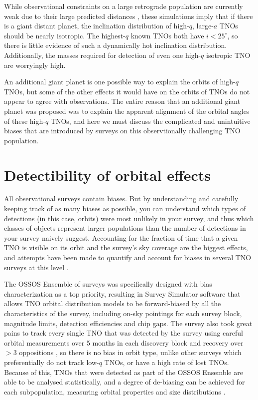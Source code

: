 \documentclass{aastex62}
\begin{document}
While observational constraints on a large retrograde population are currently weak due to their large predicted distances \citep{lawler2017}, these simulations imply that if there is a giant distant planet, the inclination distribution of high-$q$, large-$a$ TNOs should be nearly isotropic.
The highest-$q$ known TNOs both have $i<25^{\circ}$, so there is little evidence of such a dynamically hot inclination distribution.
Additionally, the masses required for detection of even one high-$q$ isotropic TNO are worryingly high. 

An additional giant planet is one possible way to explain the orbits of high-$q$ TNOs, but some of the other effects it would have on the orbits of TNOs do not appear to agree with observations.
The entire reason that an additional giant planet was proposed was to explain the apparent alignment of the orbital angles of these high-$q$ TNOs, and here we must discuss the complicated and unintuitive biases that are introduced by surveys on this observtionally challenging TNO population.

\section{Detectibility of orbital effects}


All observational surveys contain biases.
But by understanding and carefully keeping track of as many biases as possible, you can understand which types of detections (in this case, orbits) were most unlikely in your survey, and thus which classes of objects represent larger populations than the number of detections in your survey naively suggest.
Accounting for the fraction of time that a given TNO is visible on its orbit and the survey's sky coverage are the biggest effects, and attempts have been made to quantify and account for biases in several TNO surveys at this level
\citep[e.g.][]{schwambetal10,adams14}.

The OSSOS Ensemble of surveys \citep{petit11,alexandersen16,petit17,bannister18} was specifically designed with bias characterization as a top priority, resulting in Survey Simulator software that allows TNO orbital distribution models to be forward-biased by all the characteristics of the survey, including on-sky pointings for each survey block, magnitude limits, detection efficiencies and chip gaps.
The survey also took great pains to track every single TNO that was detected by the survey using careful orbital measurements over 5 months in each discovery block and recovery over $>3$ oppositions \citep{bannister18}, so there is no bias in orbit type, unlike other surveys which preferentially do not track low-$q$ TNOs, or have a high rate of lost TNOs.
Because of this, TNOs that were detected as part of the OSSOS Ensemble are able to be analysed statistically, and a degree of de-biasing can be achieved for each subpopulation, measuring orbital properties and size distributions \citep{lawler2018}.
\end{document}
